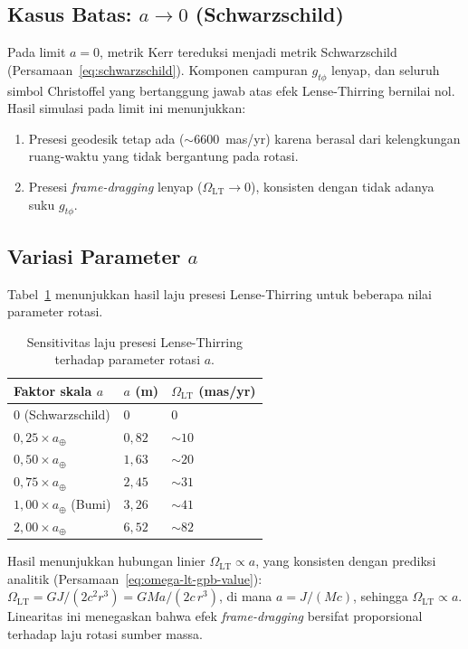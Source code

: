 \subsection{Kasus Batas: $a \to 0$ (Schwarzschild)}

Pada limit $a = 0$, metrik Kerr tereduksi menjadi
metrik Schwarzschild (Persamaan~\ref{eq:schwarzschild}).
Komponen campuran $g_{t\phi}$ lenyap,
dan seluruh simbol Christoffel yang bertanggung jawab
atas efek Lense-Thirring bernilai nol.
Hasil simulasi pada limit ini menunjukkan:
\begin{enumerate}
    \item Presesi geodesik tetap ada ($\sim 6600$~mas/yr)
          karena berasal dari kelengkungan ruang-waktu
          yang tidak bergantung pada rotasi.
    \item Presesi \textit{frame-dragging} lenyap ($\Omega_{\text{LT}} \to 0$),
          konsisten dengan tidak adanya suku $g_{t\phi}$.
\end{enumerate}

\subsection{Variasi Parameter $a$}

Tabel~\ref{tab:sensitivitas-a} menunjukkan hasil laju presesi
Lense-Thirring untuk beberapa nilai parameter rotasi.

\begin{table}[ht]
\centering
\caption{Sensitivitas laju presesi Lense-Thirring terhadap parameter rotasi $a$.}
\label{tab:sensitivitas-a}
\begin{tabular}{lll}
\toprule
\textbf{Faktor skala $a$} & \textbf{$a$ (m)} & \textbf{$\Omega_{\text{LT}}$ (mas/yr)} \\
\midrule
$0$ (Schwarzschild) & $0$ & $0$ \\
$0{,}25\times a_\oplus$ & $0{,}82$ & $\sim 10$ \\
$0{,}50\times a_\oplus$ & $1{,}63$ & $\sim 20$ \\
$0{,}75\times a_\oplus$ & $2{,}45$ & $\sim 31$ \\
$1{,}00\times a_\oplus$ (Bumi) & $3{,}26$ & $\sim 41$ \\
$2{,}00\times a_\oplus$ & $6{,}52$ & $\sim 82$ \\
\bottomrule
\end{tabular}
\end{table}

Hasil menunjukkan hubungan linier $\Omega_{\text{LT}} \propto a$,
yang konsisten dengan prediksi analitik
(Persamaan~\ref{eq:omega-lt-gpb-value}):
$\Omega_{\text{LT}} = GJ/(2c^2 r^3) = GMa/(2c\, r^3)$,
di mana $a = J/(Mc)$, sehingga $\Omega_{\text{LT}} \propto a$.
Linearitas ini menegaskan bahwa efek \textit{frame-dragging}
bersifat proporsional terhadap laju rotasi sumber massa.


